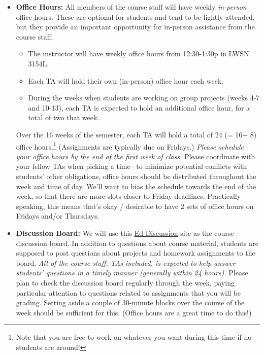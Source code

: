 \documentclass[letterpaper,11pt]{article}
\begin{document}
\begin{itemize}
\item \textbf{Office Hours:} All members of the course staff will have
  weekly \emph{in-person} office hours. These are optional for
  students and tend to be lightly attended, but they provide an
  important opportunity for in-person assistance from the course
  staff.
  \begin{itemize}
  \item The instructor will have weekly office hours from 12:30-1:30p
    in LWSN 3154L.
  \item Each TA will hold their own (in-person) office hour each week.
  \item During the weeks when students are working on group projects
    (weeks 4-7 and 10-13), each TA is expected to hold an additional
    office hour, for a total of two that week.
  \end{itemize}
  Over the 16 weeks of the semester, each TA will hold a total of 24
  (= 16+ 8) office hours.\footnote{Note that you are free to work on
    whatever you want during this time if no students are around!}
  (Assignments are typically due on Fridays.) \emph{Please schedule
    your office hours by the end of the first week of class.} Please
  coordinate with your fellow TAs when picking a time-- to minimize
  potential conflicts with students' other obligations, office hours
  should be distributed throughout the week and time of day. We'll
  want to bias the schedule towards the end of the week, so that there
  are more slots closer to Friday deadlines. Practically speaking,
  this means that's okay / desirable to have 2 sets of office hours on
  Fridays and/or Thursdays.

\item \textbf{Discussion Board:} We will use this
  \href{https://edstem.org/us/courses/91171/discussion}{Ed Discussion}
  site as the course discussion board. In addition to questions about
  course material, students are supposed to post questions about
  projects and homework assignments to the board. \emph{All of the
    course staff, TAs included, is expected to help answer students'
    questions in a timely manner (generally within 24 hours).}  Please
  plan to check the discussion board regularly through the week,
  paying particular attention to questions related to assignments that
  you will be grading. Setting aside a couple of 30-minute blocks over
  the course of the week should be sufficient for this. (Office hours
  are a great time to do this!)
\end{itemize}
\end{document}
